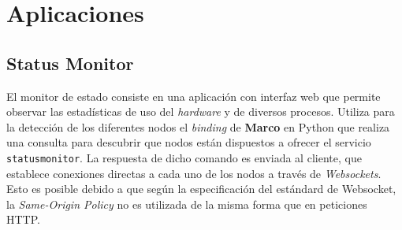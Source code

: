 \chapter{Aplicaciones}


\section{Status Monitor}

El monitor de estado consiste en una aplicación con interfaz web que permite observar las estadísticas de uso del \textit{hardware} y de diversos procesos. Utiliza para la detección de los diferentes nodos el \textit{binding} de \textbf{Marco} en Python que realiza una consulta para descubrir que nodos están dispuestos a ofrecer el servicio \texttt{statusmonitor}. La respuesta de dicho comando es enviada al cliente, que establece conexiones directas a cada uno de los nodos a través de \textit{Websockets}\cite{rfc6455}. Esto es posible debido a que según la especificación del estándard de Websocket, la \textit{Same-Origin Policy} no es utilizada de la misma forma que en peticiones HTTP\cite{rfc6454}.


